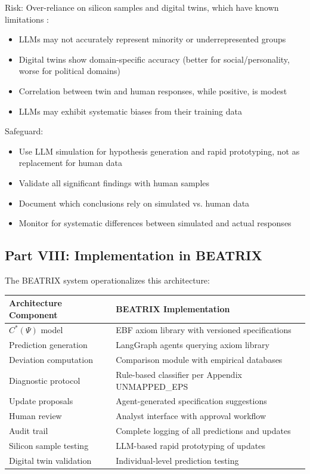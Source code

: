 Risk: Over-reliance on silicon samples and digital twins, which have known 
limitations \citep{bisbee2024, sarstedt2024}:
\begin{itemize}
    \item LLMs may not accurately represent minority or underrepresented groups
    \item Digital twins show domain-specific accuracy (better for social/personality, 
          worse for political domains)
    \item Correlation between twin and human responses, while positive, is modest
    \item LLMs may exhibit systematic biases from their training data
\end{itemize}

Safeguard:
\begin{itemize}
    \item Use LLM simulation for hypothesis generation and rapid prototyping, 
          not as replacement for human data
    \item Validate all significant findings with human samples
    \item Document which conclusions rely on simulated vs. human data
    \item Monitor for systematic differences between simulated and actual responses
\end{itemize}

\subsection{Part VIII: Implementation in BEATRIX}

The BEATRIX system operationalizes this architecture:

\begin{center}
\renewcommand{\arraystretch}{1.3}
\begin{tabular}{|l|l|}
\hline
\textbf{Architecture Component} & \textbf{BEATRIX Implementation} \\
\hline
$C^*(\Psi)$ model & EBF axiom library with versioned specifications \\
Prediction generation & LangGraph agents querying axiom library \\
Deviation computation & Comparison module with empirical databases \\
Diagnostic protocol & Rule-based classifier per Appendix UNMAPPED_EPS \\
Update proposals & Agent-generated specification suggestions \\
Human review & Analyst interface with approval workflow \\
Audit trail & Complete logging of all predictions and updates \\
Silicon sample testing & LLM-based rapid prototyping of updates \\
Digital twin validation & Individual-level prediction testing \\
\hline
\end{tabular}
\end{center}

